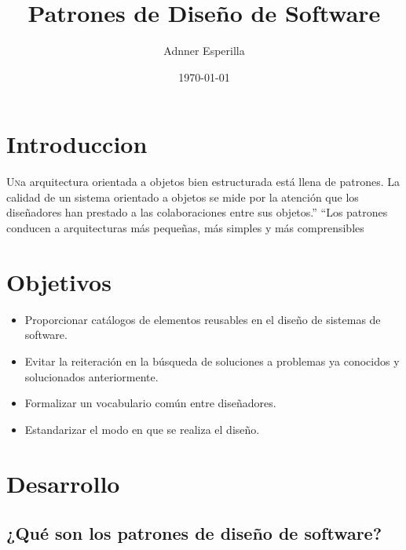 \documentclass[twoside,twocolumn]{article}
\title{Patrones de Diseño de Software} %
\author{Adnner Esperilla }
\date{\today} %
\begin{document}
\maketitle


\section{Introduccion}

\lettrine[nindent=0em,lines=3]{U}na arquitectura orientada a objetos bien estructurada está llena de patrones. La calidad de un sistema orientado a objetos se mide por la atención que los diseñadores han prestado a las colaboraciones entre sus objetos.” “Los patrones conducen a arquitecturas más pequeñas, más simples y más comprensibles





\section{Objetivos}

\begin{itemize}
\item Proporcionar catálogos de elementos reusables en el diseño de sistemas de software.
\item Evitar la reiteración en la búsqueda de soluciones a problemas ya conocidos y solucionados anteriormente.
\item Formalizar un vocabulario común entre diseñadores.
\item Estandarizar el modo en que se realiza el diseño.

\end{itemize}





\section{Desarrollo}

\subsection{¿Qué son los patrones de diseño de software?}
\end{document}
